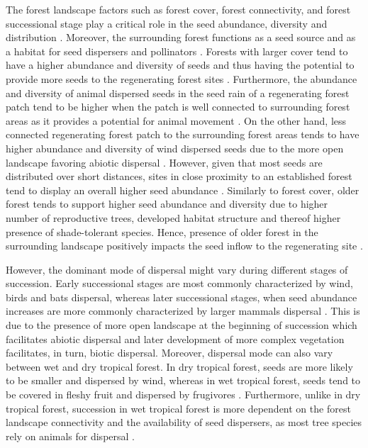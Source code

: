 The forest landscape factors such as forest cover, forest connectivity, and forest successional stage play a critical role in the seed abundance, diversity and distribution \citep{poorterComprehensiveFrameworkVegetation2024, i.hordijkLandUseHistory2024, v.h.safarLandscapeOpennessHas2022a}. Moreover, the surrounding forest functions as a seed source and as a habitat for seed dispersers and pollinators \citep{hordijkLandUseHistory2024, arroyo-rodriguezMultipleSuccessionalPathways2017}. Forests with larger cover tend to have a higher abundance and diversity of seeds and thus having the potential to provide more seeds to the regenerating forest sites \citep{poorterSuccessionalTheories2023}. Furthermore, the abundance and diversity of animal dispersed seeds in the seed rain of a regenerating forest patch tend to be higher when the patch is well connected to surrounding forest areas as it provides a potential for animal movement \citep{v.h.safarLandscapeOpennessHas2022a}. On the other hand, less connected regenerating forest patch to the surrounding forest areas tends to have higher abundance and diversity of wind dispersed seeds due to the more open landscape favoring abiotic dispersal \citep{dentUnitingNicheDifferentiation2021}. However, given that most seeds are distributed over short distances, sites in close proximity to an established forest tend to display an overall higher seed abundance \citep{chazdonSecondGrowthPromise2014, hordijkLandUseHistory2024}. Similarly to forest cover, older forest tends to support higher seed abundance and diversity due to higher number of reproductive trees, developed habitat structure and thereof higher presence of shade-tolerant species. Hence, presence of older forest in the surrounding landscape positively impacts the seed inflow to the regenerating site \citep{huancanunezSeedrainsuccessionalFeedbacksWet2021}.

However, the dominant mode of dispersal might vary during different stages of succession. Early successional stages are most commonly characterized by wind, birds and bats dispersal, whereas later successional stages, when seed abundance increases are more commonly characterized by larger mammals dispersal \citep{dentUnitingNicheDifferentiation2021}. This is due to the presence of more open landscape at the beginning of succession which facilitates abiotic dispersal and later development of more complex vegetation facilitates, in turn, biotic dispersal. Moreover, dispersal mode can also vary between wet and dry tropical forest. In dry tropical forest, seeds are more likely to be smaller and dispersed by wind, whereas in wet tropical forest, seeds tend to be covered in fleshy fruit and dispersed by frugivores \citep{vieiraPrinciplesNaturalRegeneration2006, dentUnitingNicheDifferentiation2021}. Furthermore, unlike in dry tropical forest, succession in wet tropical forest is more dependent on the forest landscape connectivity and the availability of seed dispersers, as most tree species rely on animals for dispersal \citep{hordijkLandUseHistory2024, lohbeckSuccessionalChangesFunctional2013}.

